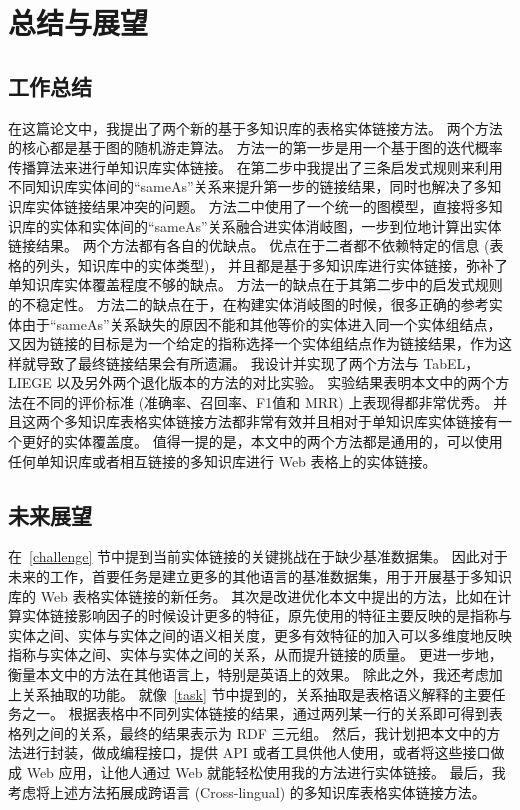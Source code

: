 \chapter{总结与展望}

\section{工作总结}
在这篇论文中，我提出了两个新的基于多知识库的表格实体链接方法。
两个方法的核心都是基于图的随机游走算法。
方法一的第一步是用一个基于图的迭代概率传播算法来进行单知识库实体链接。
在第二步中我提出了三条启发式规则来利用不同知识库实体间的``sameAs''关系来提升第一步的链接结果，同时也解决了多知识库实体链接结果冲突的问题。
方法二中使用了一个统一的图模型，直接将多知识库的实体和实体间的``sameAs''关系融合进实体消岐图，一步到位地计算出实体链接结果。
两个方法都有各自的优缺点。
优点在于二者都不依赖特定的信息 (表格的列头，知识库中的实体类型)，
并且都是基于多知识库进行实体链接，弥补了单知识库实体覆盖程度不够的缺点。
方法一的缺点在于其第二步中的启发式规则的不稳定性。
方法二的缺点在于，在构建实体消岐图的时候，很多正确的参考实体由于``sameAs''关系缺失的原因不能和其他等价的实体进入同一个实体组结点，又因为链接的目标是为一个给定的指称选择一个实体组结点作为链接结果，作为这样就导致了最终链接结果会有所遗漏。
我设计并实现了两个方法与 TabEL\cite{bhagavatula2015tabel}，LIEGE\cite{shen2012liege} 以及另外两个退化版本的方法的对比实验。
实验结果表明本文中的两个方法在不同的评价标准 (准确率、召回率、F1值和 MRR) 上表现得都非常优秀。
并且这两个多知识库表格实体链接方法都非常有效并且相对于单知识库实体链接有一个更好的实体覆盖度。
值得一提的是，本文中的两个方法都是通用的，可以使用任何单知识库或者相互链接的多知识库进行 Web 表格上的实体链接。


\section{未来展望}
在~\ref{challenge} 节中提到当前实体链接的关键挑战在于缺少基准数据集。
因此对于未来的工作，首要任务是建立更多的其他语言的基准数据集，用于开展基于多知识库的 Web 表格实体链接的新任务。
其次是改进优化本文中提出的方法，比如在计算实体链接影响因子的时候设计更多的特征，原先使用的特征主要反映的是指称与实体之间、实体与实体之间的语义相关度，更多有效特征的加入可以多维度地反映指称与实体之间、实体与实体之间的关系，从而提升链接的质量。
更进一步地，衡量本文中的方法在其他语言上，特别是英语上的效果。
除此之外，我还考虑加上关系抽取的功能。
就像~\ref{task} 节中提到的，关系抽取是表格语义解释的主要任务之一。
根据表格中不同列实体链接的结果，通过两列某一行的关系即可得到表格列之间的关系，最终的结果表示为 RDF 三元组。
然后，我计划把本文中的方法进行封装，做成编程接口，提供 API 或者工具供他人使用，或者将这些接口做成 Web 应用，让他人通过 Web 就能轻松使用我的方法进行实体链接。
最后，我考虑将上述方法拓展成跨语言\cite{zhang2013cross} (Cross-lingual) 的多知识库表格实体链接方法。







